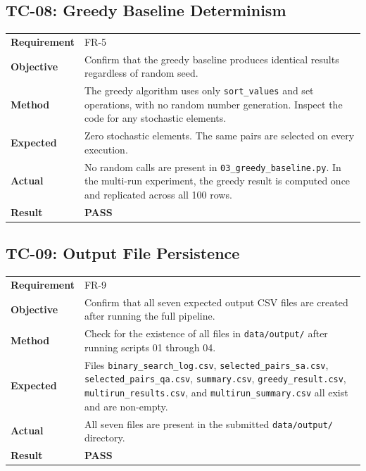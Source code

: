 \documentclass[12pt,a4paper]{article}
\newcommand{\pass}{\textcolor{green!50!black}{\textbf{PASS}}}
\begin{document}
\subsection{TC-08: Greedy Baseline Determinism}

\begin{table}[h!]
\renewcommand{\arraystretch}{1.3}
\begin{tabular}{@{}lp{10cm}@{}}
\toprule
\textbf{Requirement} & FR-5 \\
\textbf{Objective} & Confirm that the greedy baseline produces identical
    results regardless of random seed. \\
\textbf{Method} & The greedy algorithm uses only \texttt{sort\_values}
    and set operations, with no random number generation. Inspect
    the code for any stochastic elements. \\
\textbf{Expected} & Zero stochastic elements. The same pairs are selected
    on every execution. \\
\textbf{Actual} & No random calls are present in
    \texttt{03\_greedy\_baseline.py}. In the multi-run experiment, the
    greedy result is computed once and replicated across all 100 rows. \\
\textbf{Result} & \pass \\
\bottomrule
\end{tabular}
\end{table}

\subsection{TC-09: Output File Persistence}

\begin{table}[h!]
\renewcommand{\arraystretch}{1.3}
\begin{tabular}{@{}lp{10cm}@{}}
\toprule
\textbf{Requirement} & FR-9 \\
\textbf{Objective} & Confirm that all seven expected output CSV files
    are created after running the full pipeline. \\
\textbf{Method} & Check for the existence of all files in
    \texttt{data/output/} after running scripts 01 through 04. \\
\textbf{Expected} & Files \texttt{binary\_search\_log.csv},
    \texttt{selected\_pairs\_sa.csv}, \texttt{selected\_pairs\_qa.csv},
    \texttt{summary.csv}, \texttt{greedy\_result.csv},
    \texttt{multirun\_results.csv}, and \texttt{multirun\_summary.csv}
    all exist and are non-empty. \\
\textbf{Actual} & All seven files are present in the submitted
    \texttt{data/output/} directory. \\
\textbf{Result} & \pass \\
\bottomrule
\end{tabular}
\end{table}
\end{document}
